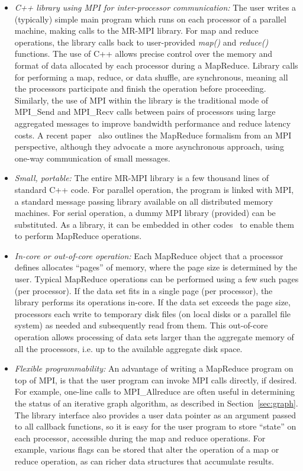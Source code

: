 \begin{itemize}

\item {\it C++ library using MPI for inter-processor communication:}
The user writes a (typically) simple main program which runs on each
processor of a parallel machine, making calls to the MR-MPI library.
For map and reduce operations, the library calls back to user-provided
{\it map()} and {\it reduce()} functions.  The use of C++ allows
precise control over the memory and format of data allocated by each
processor during a MapReduce.  Library calls for performing a map,
reduce, or data shuffle, are synchronous, meaning all the processors
participate and finish the operation before proceeding.  Similarly,
the use of MPI within the library is the traditional mode of MPI\_Send
and MPI\_Recv calls between pairs of processors using large aggregated
messages to improve bandwidth performance and reduce latency costs.  A
recent paper~\cite{Hoefler09} also outlines the MapReduce formalism
from an MPI perspective, although they advocate a more asynchronous
approach, using one-way communication of small messages.

\item {\it Small, portable:} The entire MR-MPI library is a few
thousand lines of standard C++ code.  For parallel operation, the
program is linked with MPI, a standard message passing library
available on all distributed memory machines.  For serial operation, a
dummy MPI library (provided) can be substituted.  As a library, it can
be embedded in other codes~\cite{Titan} to enable them to perform
MapReduce operations.

\item {\it In-core or out-of-core operation:} Each MapReduce object
that a processor defines allocates ``pages'' of memory, where the page
size is determined by the user.  Typical MapReduce operations can be
performed using a few such pages (per processor).  If the data set
fits in a single page (per processor), the library performs its
operations in-core.  If the data set exceeds the page size, processors
each write to temporary disk files (on local disks or a parallel file
system) as needed and subsequently read from them.  This out-of-core
operation allows processing of data sets larger than the aggregate
memory of all the processors, i.e. up to the available aggregate disk
space.

\item {\it Flexible programmability:} An advantage of writing a
MapReduce program on top of MPI, is that the user program can invoke
MPI calls directly, if desired.  For example, one-line calls to
MPI\_Allreduce are often useful in determining the status of an
iterative graph algorithm, as described in Section~\ref{sec:graph}.
The library interface also provides a user data pointer as an argument
passed to all callback functions, so it is easy for the user program
to store ``state'' on each processor, accessible during the map and
reduce operations.  For example, various flags can be stored that
alter the operation of a map or reduce operation, as can richer data
structures that accumulate results.


\end{itemize}
